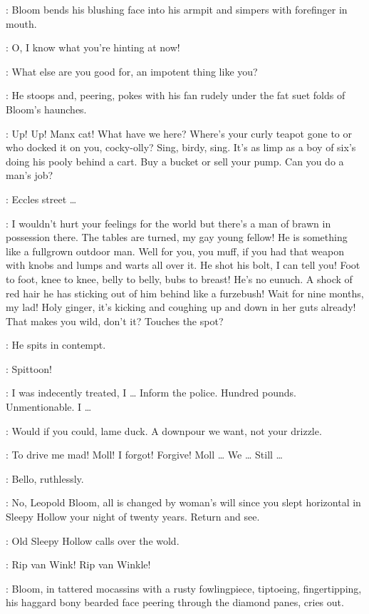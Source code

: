 :
Bloom bends his blushing face into his armpit
and simpers with forefinger in mouth.

\Bloom:
O, I know what you're hinting at now!

\Bello:
What else are you good for, an impotent thing like you?

:
He stoops and, peering, pokes with his fan rudely
under the fat suet folds of Bloom's haunches.

\Bello:
Up! Up!
Manx cat!
What have we here?
Where's your curly teapot gone to or who docked it on you, cocky-olly?
Sing, birdy, sing.
It's as limp as a boy of six's doing his pooly behind a cart.
Buy a bucket or sell your pump.
Can you do a man's job?

\Bloom:
Eccles street \ldots

\Bello:
I wouldn't hurt your feelings for the world
but there's a man of brawn in possession there.
The tables are turned, my gay young fellow!
He is something like a fullgrown outdoor man.
Well for you, you muff, if you had that weapon
with knobs and lumps and warts all over it.
He shot his bolt, I can tell you!
Foot to foot, knee to knee, belly to belly, bubs to breast!
He's no eunuch.
A shock of red hair he has sticking out of him behind like a furzebush!
Wait for nine months, my lad!
Holy ginger, it's kicking and coughing up and down in her guts already!
That makes you wild, don't it?
Touches the spot?

:
He spits in contempt.

\Bello:
Spittoon!

\Bloom:
I was indecently treated, I \ldots
Inform the police.
Hundred pounds.
Unmentionable.
I \ldots

\Bello:
Would if you could, lame duck.
A downpour we want, not your drizzle.

\Bloom:
To drive me mad!
Moll!
I forgot!
Forgive!
Moll \ldots
We \ldots
Still \ldots

:
Bello, ruthlessly.

\Bello:
No, Leopold Bloom, all is changed by woman's will
since you slept horizontal in Sleepy Hollow your night of twenty years.
Return and see.

:
Old Sleepy Hollow calls over the wold.

\SleepyHollow:
Rip van Wink!
Rip van Winkle!

:
Bloom, in tattered mocassins with a rusty fowlingpiece,
tiptoeing, fingertipping,
his haggard bony bearded face peering through the diamond panes, cries out.

